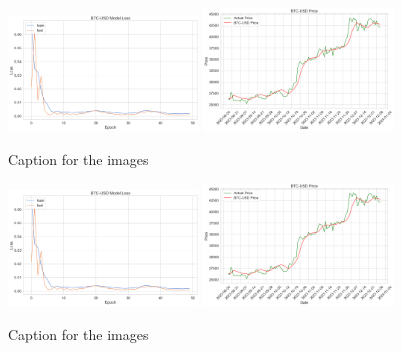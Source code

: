 \documentclass{ledger}
\begin{document}
\begin{figure}[htbp]
    \centering
    \includegraphics[width=0.45\textwidth]{code/price-prediction/lstm/images/btc_usd_loss.png} %
    \hspace{0.05\textwidth} %
    \includegraphics[width=0.45\textwidth]{code/price-prediction/lstm/images/btc_usd_price.png} %
    \caption{Caption for the images}
    \label{fig:side_by_side}
\end{figure}

\begin{figure}[htbp]
    \centering
    \includegraphics[width=0.45\textwidth]{code/price-prediction/lstm/images/btc_usd_loss.png} %
    \hspace{0.05\textwidth} %
    \includegraphics[width=0.45\textwidth]{code/price-prediction/lstm/images/btc_usd_price.png} %
    \caption{Caption for the images}
    \label{fig:side_by_side}
\end{figure}
\end{document}
